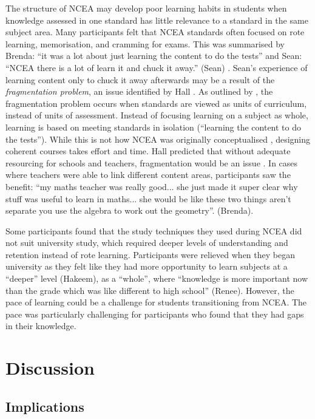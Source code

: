 \documentclass[a4paper,man,natbib]{apa6}
\begin{document}
The structure of NCEA may develop poor learning habits in students when knowledge assessed in one standard has little relevance to a standard in the same subject area. Many participants felt that NCEA standards often focused on rote learning, memorisation, and cramming for exams. This was summarised by Brenda: ``it was a lot about just learning the content to do the tests'' and Sean: ``NCEA there is a lot of learn it and chuck it away.'' (Sean) . Sean's experience of learning content only to chuck it away afterwards may be a result of the \textit{fragmentation problem}, an issue identified by Hall \cite{hall2000national}. As outlined by \cite{hipkins}, the fragmentation problem occurs when standards are viewed as units of curriculum, instead of units of assessment. Instead of focusing learning on a subject as whole, learning is based on meeting standards in isolation (``learning the content to do the tests''). While this is not how NCEA was originally conceptualised \cite{hipkins}, designing coherent courses takes effort and time. Hall predicted that without adequate resourcing for schools and teachers, fragmentation would be an issue \cite{hall2000national}. In cases where teachers were able to link different content areas, participants saw the benefit: ``my maths teacher was really good... she just made it super clear why stuff was useful to learn in maths... she would be like these two things aren't separate you use the algebra to work out the geometry''. (Brenda).
 

Some participants found that the study techniques they used during NCEA did not suit university study, which required deeper levels of understanding and retention instead of rote learning. Participants were relieved when they began university as they felt like they had more opportunity to learn subjects at a ``deeper'' level (Hakeem), as a ``whole'', where ``knowledge is more important now than the grade which was like different to high school'' (Renee). However, the pace of learning could be a challenge for students transitioning from NCEA. The pace was particularly challenging for participants who found that they had gaps in their knowledge.

\section{Discussion}

\subsection*{Implications}
\end{document}
